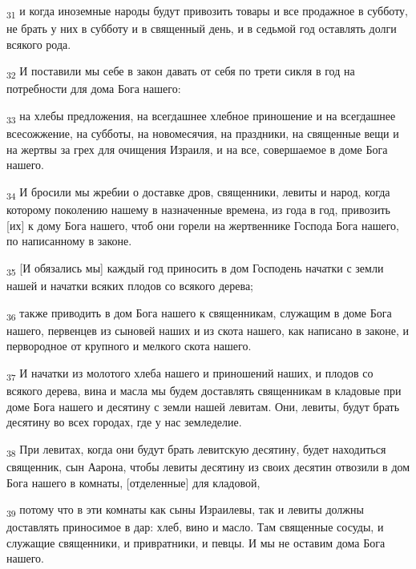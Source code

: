 \begin{tcolorbox}
\textsubscript{31} и когда иноземные народы будут привозить товары и все продажное в субботу, не брать у них в субботу и в священный день, и в седьмой год оставлять долги всякого рода.
\end{tcolorbox}
\begin{tcolorbox}
\textsubscript{32} И поставили мы себе в закон давать от себя по трети сикля в год на потребности для дома Бога нашего:
\end{tcolorbox}
\begin{tcolorbox}
\textsubscript{33} на хлебы предложения, на всегдашнее хлебное приношение и на всегдашнее всесожжение, на субботы, на новомесячия, на праздники, на священные вещи и на жертвы за грех для очищения Израиля, и на все, совершаемое в доме Бога нашего.
\end{tcolorbox}
\begin{tcolorbox}
\textsubscript{34} И бросили мы жребии о доставке дров, священники, левиты и народ, когда которому поколению нашему в назначенные времена, из года в год, привозить [их] к дому Бога нашего, чтоб они горели на жертвеннике Господа Бога нашего, по написанному в законе.
\end{tcolorbox}
\begin{tcolorbox}
\textsubscript{35} [И обязались мы] каждый год приносить в дом Господень начатки с земли нашей и начатки всяких плодов со всякого дерева;
\end{tcolorbox}
\begin{tcolorbox}
\textsubscript{36} также приводить в дом Бога нашего к священникам, служащим в доме Бога нашего, первенцев из сыновей наших и из скота нашего, как написано в законе, и первородное от крупного и мелкого скота нашего.
\end{tcolorbox}
\begin{tcolorbox}
\textsubscript{37} И начатки из молотого хлеба нашего и приношений наших, и плодов со всякого дерева, вина и масла мы будем доставлять священникам в кладовые при доме Бога нашего и десятину с земли нашей левитам. Они, левиты, будут брать десятину во всех городах, где у нас земледелие.
\end{tcolorbox}
\begin{tcolorbox}
\textsubscript{38} При левитах, когда они будут брать левитскую десятину, будет находиться священник, сын Аарона, чтобы левиты десятину из своих десятин отвозили в дом Бога нашего в комнаты, [отделенные] для кладовой,
\end{tcolorbox}
\begin{tcolorbox}
\textsubscript{39} потому что в эти комнаты как сыны Израилевы, так и левиты должны доставлять приносимое в дар: хлеб, вино и масло. Там священные сосуды, и служащие священники, и привратники, и певцы. И мы не оставим дома Бога нашего.
\end{tcolorbox}
